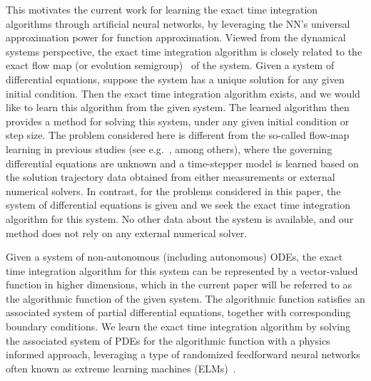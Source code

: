 This motivates the current work for learning the exact time integration algorithms
through artificial neural networks, by leveraging the NN's universal approximation
power for function approximation.
%
Viewed from the dynamical systems perspective, the exact time integration
algorithm is closely related to the exact flow map (or evolution semigroup)~\cite{StuartH1996}
of the system. Given a system of differential equations, suppose
the system has a unique solution for any given initial condition.
Then the exact time integration algorithm  exists, and
we would like to learn this algorithm from the given system. The learned algorithm
then provides a method for solving this system, under any given initial condition
or step size.
The problem considered here is different from the so-called flow-map learning in
previous studies (see e.g.~\cite{QinWX2019,ChurchillX2023,LiuKB2022}, among others),
where the governing differential equations are unknown and a time-stepper model
is learned based on the solution trajectory data obtained from
either measurements or external numerical solvers.
In contrast, for the problems considered in this paper,
the system of differential equations is given and we seek
the exact time integration algorithm for this system. No other data
about the system is available,  and our method
does not rely on any external numerical solver.

%


Given a system of non-autonomous (including autonomous) ODEs,
the exact time integration algorithm for this system can be represented by a vector-valued
function in higher dimensions, which in the current paper will be referred to as
the algorithmic function of the given system.
The algorithmic function satisfies an associated system of
partial differential equations, together with corresponding boundary conditions.
We learn the exact time integration algorithm  by
solving the associated system of PDEs  for
the  algorithmic function with a physics informed approach,
leveraging a type of randomized feedforward neural networks
often known as extreme learning machines (ELMs)~\cite{DongL2021,DongY2022rm,WangD2024}.


